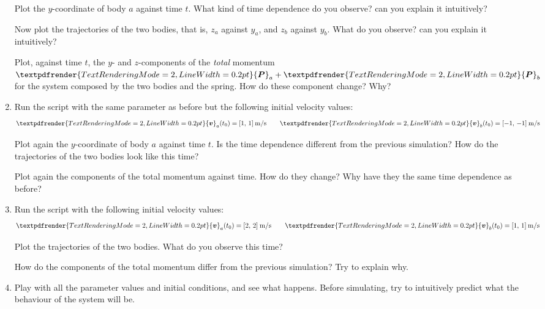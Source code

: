 \documentclass[a4paper,12pt,%
onecolumn,oneside,%
british%
]{memoir}
\renewcommand*{\bm}[1]{\textpdfrender{TextRenderingMode=2,LineWidth=0.2pt}{\boldsymbol{#1}}}
\renewcommand*{\|}[1][]{\nonscript\:#1\vert\nonscript\:\mathopen{}}
\newcommand*{\yv}{\bm{v}}
\newcommand*{\yva}{\yv_{a}}
\newcommand*{\yvb}{\yv_{b}}
\newcommand*{\yti}{t_{0}}
\newcommand*{\yP}{\bm{P}}
\newcommand*{\yPa}{\yP_{a}}
\newcommand*{\yPb}{\yP_{b}}
\begin{document}
\begin{exercise}[label={ex:hooke}]
\begin{enumerate}[exerc]
    Plot the $y$-coordinate of body $a$ against time $t$. What kind of time dependence do you observe? can you explain it intuitively?

    Now plot the trajectories of the two bodies, that is, $z_{a}$ against $y_{a}$, and $z_{b}$ against $y_{b}$. What do you observe? can you explain it intuitively?

    Plot, against time $t$, the $y$- and $z$-components of the \emph{total} momentum $\yPa+\yPb$ for the system composed by the two bodies and the spring. How do these component change? Why?

  \item Run the script with the same parameter as before but the following initial velocity values:
    \begin{equation*}
      \begin{gathered}
        \yva(\yti)=[\num{1},\, \num{1}]\:\unit{m/s}
        \qquad
        \yvb(\yti)=[\num{-1},\, \num{-1}]\:\unit{m/s}
      \end{gathered}
    \end{equation*}

    Plot again the $y$-coordinate of body $a$ against time $t$. Is the time dependence different from the previous simulation? How do the trajectories of the two bodies look like this time?

    Plot again the components of the total momentum against time. How do they change? Why have they the same time dependence as before?


      \item Run the script with the following initial velocity values:
    \begin{equation*}
      \begin{gathered}
        \yva(\yti)=[\num{2},\, \num{2}]\:\unit{m/s}
        \qquad
        \yvb(\yti)=[\num{1},\, \num{1}]\:\unit{m/s}
      \end{gathered}
    \end{equation*}

    Plot the trajectories of the two bodies. What do you observe this time?

    How do the components of the total momentum differ from the previous simulation? Try to explain why.

  \item Play with all the parameter values and initial conditions, and see what happens. Before simulating, try to intuitively predict what the behaviour of the system will be.
  \end{enumerate}
\end{exercise}
\end{document}
